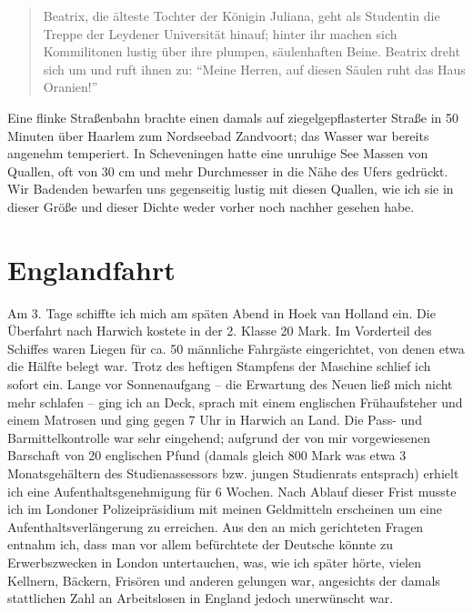 \begin{quote}
	Beatrix, die älteste Tochter der Königin Juliana, geht als Studentin die Treppe der Leydener Universität hinauf; hinter ihr machen sich Kommilitonen lustig über ihre plumpen, säulenhaften Beine. Beatrix dreht sich um und ruft ihnen zu: \enquote{Meine Herren, auf diesen Säulen ruht das Haus Oranien!}
\end{quote}

Eine flinke Straßenbahn brachte einen damals auf ziegelgepflasterter Straße in 50 Minuten über Haarlem zum Nordseebad Zandvoort; das Wasser war bereits angenehm temperiert. In Scheveningen hatte eine unruhige See Massen von Quallen, oft von 30 cm und mehr Durchmesser in die Nähe des Ufers gedrückt. Wir Badenden bewarfen uns gegenseitig lustig mit diesen Quallen, wie ich sie in dieser Größe und dieser Dichte weder vorher noch nachher gesehen habe.



\section{Englandfahrt}
Am 3. Tage schiffte ich mich am späten Abend in Hoek van Holland ein. Die Überfahrt nach Harwich kostete in der 2. Klasse 20 Mark. Im Vorderteil des Schiffes waren Liegen für ca. 50 männliche Fahrgäste eingerichtet, von denen etwa die Hälfte belegt war. Trotz des heftigen Stampfens der Maschine schlief ich sofort ein. Lange vor Sonnenaufgang -- die Erwartung des Neuen ließ mich nicht mehr schlafen -- ging ich an Deck, sprach mit einem englischen Frühaufsteher und einem Matrosen und ging gegen 7 Uhr in Harwich an Land. Die Pass- und Barmittelkontrolle war sehr eingehend; aufgrund der von mir vorgewiesenen Barschaft von 20 englischen Pfund (damals gleich 800 Mark was etwa 3 Monatsgehältern des Studienassessors bzw. jungen Studienrats entsprach) erhielt ich eine Aufenthaltsgenehmigung für 6 Wochen. Nach Ablauf dieser Frist musste ich im Londoner Polizeipräsidium mit meinen Geldmitteln erscheinen um eine Aufenthaltsverlängerung zu erreichen. Aus den an mich gerichteten Fragen entnahm ich, dass man vor allem befürchtete der Deutsche könnte zu Erwerbszwecken in London untertauchen, was, wie ich später hörte, vielen Kellnern, Bäckern, Frisören und anderen gelungen war, angesichts der damals stattlichen Zahl an Arbeitslosen in England jedoch unerwünscht war.

